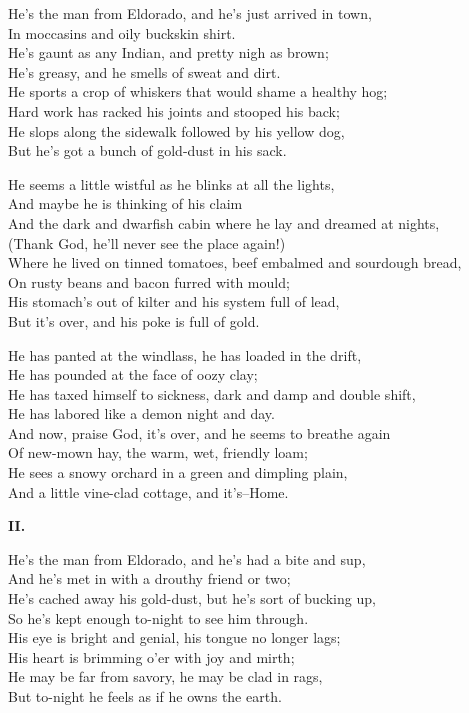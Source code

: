 
\begin{poemblock}
He's the man from Eldorado, and he's just arrived in town,\\
\idt In moccasins and oily buckskin shirt.\\
He's gaunt as any Indian, and pretty nigh as brown;\\
\idt He's greasy, and he smells of sweat and dirt.\\
He sports a crop of whiskers that would shame a healthy hog;\\
\idt Hard work has racked his joints and stooped his back;\\
He slops along the sidewalk followed by his yellow dog,\\
\idt But he's got a bunch of gold-dust in his sack.

He seems a little wistful as he blinks at all the lights,\\
\idt And maybe he is thinking of his claim\\
And the dark and dwarfish cabin where he lay and dreamed at nights,\\
\idt (Thank God, he'll never see the place again!)\\
Where he lived on tinned tomatoes, beef embalmed and sourdough bread,\\
\idt On rusty beans and bacon furred with mould;\\
His stomach's out of kilter and his system full of lead,\\
\idt But it's over, and his poke is full of gold.

He has panted at the windlass, he has loaded in the drift,\\
\idt He has pounded at the face of oozy clay;\\
He has taxed himself to sickness, dark and damp and double shift,\\
\idt He has labored like a demon night and day.\\
And now, praise God, it's over, and he seems to breathe again\\
\idt Of new-mown hay, the warm, wet, friendly loam;\\
He sees a snowy orchard in a green and dimpling plain,\\
\idt And a little vine-clad cottage, and it's--Home.

\textbf{II.}

He's the man from Eldorado, and he's had a bite and sup,\\
\idt And he's met in with a drouthy friend or two;\\
He's cached away his gold-dust, but he's sort of bucking up,\\
\idt So he's kept enough to-night to see him through.\\
His eye is bright and genial, his tongue no longer lags;\\
\idt His heart is brimming o'er with joy and mirth;\\
He may be far from savory, he may be clad in rags,\\
\idt But to-night he feels as if he owns the earth.


\end{poemblock}
